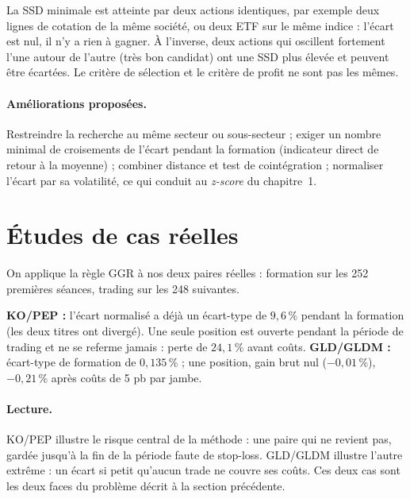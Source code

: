\begin{pitfall}
La SSD minimale est atteinte par deux actions identiques, par exemple deux lignes de cotation de la même société, ou deux ETF sur le même indice : l'écart est nul, il n'y a rien à gagner. À l'inverse, deux actions qui oscillent fortement l'une autour de l'autre (très bon candidat) ont une SSD plus élevée et peuvent être écartées. Le critère de sélection et le critère de profit ne sont pas les mêmes.
\end{pitfall}

\paragraph{Améliorations proposées.} Restreindre la recherche au même secteur ou sous-secteur \citep{dofaff2012} ; exiger un nombre minimal de croisements de l'écart pendant la formation (indicateur direct de retour à la moyenne) ; combiner distance et test de cointégration \citep{huck2009,rad2016} ; normaliser l'écart par sa volatilité, ce qui conduit au \emph{z-score} du chapitre~1.

\section{Études de cas réelles}

On applique la règle GGR à nos deux paires réelles : formation sur les 252 premières séances, trading sur les 248 suivantes.

\begin{codebox}
\textbf{KO/PEP :} l'écart normalisé a déjà un écart-type de $9{,}6\,\%$ pendant la formation (les deux titres ont divergé). Une seule position est ouverte pendant la période de trading et ne se referme jamais : perte de $24{,}1\,\%$ avant coûts. \textbf{GLD/GLDM :} écart-type de formation de $0{,}135\,\%$ ; une position, gain brut nul ($-0{,}01\,\%$), $-0{,}21\,\%$ après coûts de 5 pb par jambe.
\end{codebox}

\paragraph{Lecture.} KO/PEP illustre le risque central de la méthode : une paire qui ne revient pas, gardée jusqu'à la fin de la période faute de stop-loss. GLD/GLDM illustre l'autre extrême : un écart si petit qu'aucun trade ne couvre ses coûts. Ces deux cas sont les deux faces du problème décrit à la section précédente.

